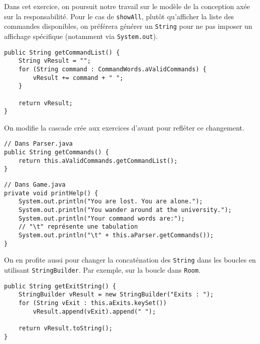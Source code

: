 \begin{exercise}[subtitle=getCommandList]

Dans cet exercice, on poursuit notre travail sur le modèle de la conception axée sur la responsabilité. Pour le cas de \verb|showAll|, plutôt qu'afficher la liste des commandes disponibles, on préférera générer un \verb|String| pour ne pas imposer un affichage spécifique (notamment via \verb|System.out|).

\begin{verbatim}
public String getCommandList() {
    String vResult = "";
    for (String command : CommandWords.aValidCommands) {
        vResult += command + " ";
    }

    return vResult;
}
\end{verbatim}

On modifie la cascade crée aux exercices d'avant pour refléter ce changement.

\begin{verbatim}
// Dans Parser.java
public String getCommands() {
    return this.aValidCommands.getCommandList();
}
\end{verbatim}

\begin{verbatim}
// Dans Game.java
private void printHelp() {
    System.out.println("You are lost. You are alone.");
    System.out.println("You wander around at the university.");
    System.out.println("Your command words are:");
    // "\t" représente une tabulation
    System.out.println("\t" + this.aParser.getCommands());
}
\end{verbatim}

On en profite aussi pour changer la concaténation des \verb|String| dans les boucles en utilisant \verb|StringBuilder|. Par exemple, sur la boucle dans \verb|Room|.

\begin{verbatim}
public String getExitString() {
    StringBuilder vResult = new StringBuilder("Exits : ");
    for (String vExit : this.aExits.keySet())
        vResult.append(vExit).append(" ");

    return vResult.toString();
}
\end{verbatim}
\end{exercise}

